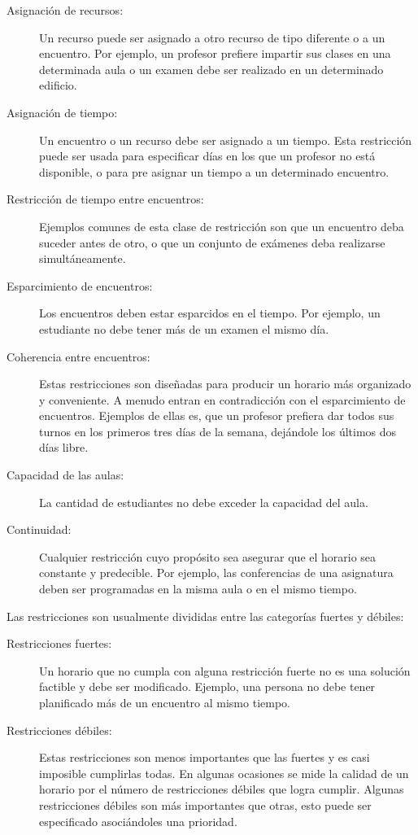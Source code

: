 \begin{description}
	\item[Asignación de recursos:] Un recurso puede ser asignado a otro recurso de tipo diferente o a un encuentro.
		Por ejemplo, un profesor prefiere impartir sus clases en una determinada aula o un examen debe ser realizado
		en un determinado edificio.
	\item[Asignación de tiempo:] Un encuentro o un recurso debe ser asignado a un tiempo. Esta restricción puede
		ser usada para especificar días en los que un profesor no está disponible, o para pre asignar un
		tiempo a un determinado encuentro.
	\item[Restricción de tiempo entre encuentros:] Ejemplos comunes de esta clase de restricción son que un encuentro
		deba suceder antes de otro, o que un conjunto de exámenes deba realizarse simult\'aneamente.
	\item[Esparcimiento de encuentros:] Los encuentros deben estar esparcidos en el tiempo. Por ejemplo, un
		estudiante no debe tener más de un examen el mismo día.
	\item[Coherencia entre encuentros:] Estas restricciones son diseñadas para producir un horario más organizado
		y conveniente. A menudo entran en contradicción con el esparcimiento de encuentros. Ejemplos de ellas es,
		que un profesor prefiera dar todos sus turnos en los primeros tres d\'ias de la semana, dejándole los
		últimos dos d\'ias libre.
	\item[Capacidad de las aulas:] La cantidad de estudiantes no debe exceder la capacidad del aula.
	\item[Continuidad:] Cualquier restricción cuyo propósito sea asegurar que el horario sea constante y predecible.
		Por ejemplo, las conferencias de una asignatura deben ser programadas en la misma aula o en el mismo tiempo.
\end{description}

Las restricciones son usualmente divididas entre las categor\'ias fuertes y débiles:

\begin{description}
	\item[Restricciones fuertes:] Un horario que no cumpla con alguna restricción fuerte no es una solución factible
		y debe ser modificado. Ejemplo, una persona no debe tener planificado más de un encuentro al mismo tiempo.
	\item[Restricciones débiles:] Estas restricciones son menos importantes que las fuertes y es casi imposible
		cumplirlas todas. En algunas ocasiones se mide la calidad de un horario por el número de restricciones
		débiles que logra cumplir. Algunas restricciones débiles son más importantes que otras, esto puede ser
		especificado asoci\'andoles una prioridad.
\end{description}

